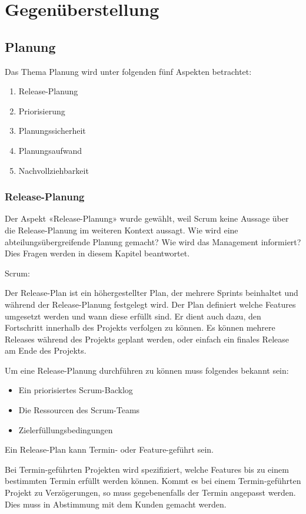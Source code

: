 \chapter{Gegenüberstellung}
\thispagestyle{fancy}
\section{Planung}

Das Thema Planung wird unter folgenden fünf Aspekten betrachtet:
\begin{enumerate}
\item Release-Planung
\item Priorisierung
\item Planungssicherheit
\item Planungsaufwand
\item Nachvollziehbarkeit
\end{enumerate}

\subsection{Release-Planung}

Der Aspekt «Release-Planung» wurde gewählt, weil Scrum keine Aussage über die Release-Planung im weiteren Kontext aussagt. Wie wird eine abteilungsübergreifende Planung gemacht? Wie wird das Management informiert? Dies Fragen werden in diesem Kapitel beantwortet.

{\Large Scrum:} \cite{planningReleaseScrum} \medskip

Der Release-Plan ist ein höhergestellter Plan, der mehrere Sprints beinhaltet und während der Release-Planung festgelegt wird. Der Plan definiert welche Features umgesetzt werden und wann diese erfüllt sind. Er dient auch dazu, den Fortschritt innerhalb des Projekts verfolgen zu können. Es können mehrere Releases während des Projekts geplant werden, oder einfach ein finales Release am Ende des Projekts. \medskip

Um eine Release-Planung durchführen zu können muss folgendes bekannt sein:
\begin{itemize}
\item Ein priorisiertes Scrum-Backlog
\item Die Ressourcen des Scrum-Teams
\item Zielerfüllungsbedingungen
\end{itemize}
Ein Release-Plan kann Termin- oder Feature-geführt sein.\smallskip

Bei Termin-geführten Projekten wird spezifiziert, welche Features bis zu einem bestimmten Termin erfüllt werden können.\smallskip
Kommt es bei einem Termin-geführten Projekt zu Verzögerungen, so muss gegebenenfalls der Termin angepasst werden. Dies muss in Abstimmung mit dem Kunden gemacht werden.

